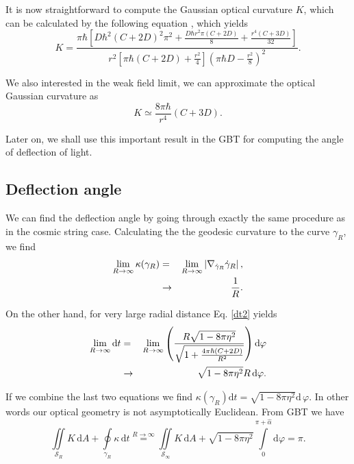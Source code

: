 \documentclass[preprint,superscriptaddress,amsfonts,amssymb,amsmath,showpacs]{revtex4}
\begin{document}
It is now straightforward to compute the Gaussian optical curvature $K$, which can be calculated by the following equation \cite{gibbons1}, which yields
\begin{equation}
K=\frac{\pi \hbar \left[D\hbar^2(C+2D)^2 \pi^2+\frac{D\hbar r^2 \pi (C+2D)}{8}+\frac{r^4 (C+3D)}{32}    \right]}{r^2\left[\pi \hbar (C+2D)+\frac{r^2}{4}\right]\left(\pi \hbar D-\frac{r^2}{8}\right)^2}.
\end{equation}

We also interested in the weak field limit, we can approximate the optical Gaussian curvature as 
\begin{equation}\label{GaussianCurvature2}
K\simeq  \frac{8 \pi \hbar }{r^4} \left(C+3D \right).
\end{equation}

Later on, we shall use this important result in the GBT for computing the angle of deflection of light.

\subsection{Deflection angle}

We can find the deflection angle by going through exactly the same procedure as in the cosmic string case. Calculating the 
the geodesic curvature to the curve $\gamma_R$, we find
\begin{eqnarray}\notag
\lim_{R\rightarrow \infty }\kappa (\gamma_{R}) &=&\lim_{R\rightarrow \infty
}\left\vert \nabla _{\dot{\gamma}_{R}}\dot{\gamma}_{R}\right\vert , \notag \\
&\rightarrow &\frac{1}{R}. 
\end{eqnarray}%


On the other hand, for very large radial distance Eq. \eqref{dt2} yields
\begin{eqnarray}\notag
\lim_{R\rightarrow \infty } \mathrm{d}t &=&\lim_{R\rightarrow \infty
}\left( \frac{R \sqrt{1-8 \pi \eta^2}}{\sqrt{1+\frac{4 \pi \hbar (C+2D) }{R^2}}}\right) \mathrm{d}\varphi\\
&\to & \sqrt{1-8 \pi \eta^2} R \, \mathrm{d}\varphi.  
\end{eqnarray}%

If we combine the last two equations we  find $
\kappa (\gamma_{R})\mathrm{d}t=\sqrt{1-8 \pi \eta^2} \mathrm{d}\,\varphi
$. In other words our optical geometry is not asymptotically  Euclidean. From GBT we have
\begin{equation}\label{GBT3}
\iint\limits_{\mathcal{S}_{R}}K\,\mathrm{d}A+\oint\limits_{\gamma_{R}}\kappa \,%
\mathrm{d}t\overset{{R\rightarrow \infty }}{=}\iint\limits_{\mathcal{S}%
_{\infty }}K\,\mathrm{d}A+ \sqrt{1-8 \pi \eta^2} \int\limits_{0}^{\pi + \hat{\alpha}}\mathrm{d}\varphi
=\pi.
\end{equation}
\end{document}
